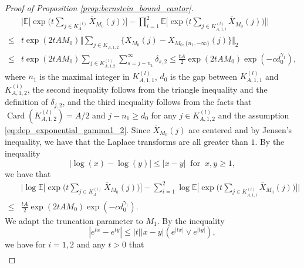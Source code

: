 \documentclass[11pt]{article}
\DeclareMathOperator*{\card}{Card}
\theoremstyle{plain}
\theoremstyle{definition}
\begin{document}
\begin{proof}[Proof of Proposition \ref{prop:bernstein_bound_cantor}]
    \begin{equation*}
    \begin{aligned}
        &\Big|\mathbb{E}\Big[\exp\Big(t\sum_{j \in K_{A}^{(l)}}\overline{X}_{M_0}(j)\Big)\Big] - \prod_{i=1}^2\mathbb{E}\Big[\exp\Big( t\sum_{j \in K_{A,1,i}^{(l)}}\overline{X}_{M_0}(j) \Big)\Big]\Big|\\
        \leq& t\exp(2tAM_0)\Big\Vert \sum_{j \in K_{A,1,2}}\{\overline{X}_{M_0}(j) - \overline{X}_{M_0, \{n_1, -\infty\}}(j)\} \Big\Vert_2\\
        \leq& t\exp(2tAM_0)\sum_{j \in K_{A,1,2}^{(l)}} \sum_{s = j-n_1}^{\infty}\delta_{s,2} \leq \frac{tA}{2}\exp(2tAM_0)\exp(-cd_0^{\gamma_1}),
    \end{aligned}
    \end{equation*}
    where $n_1$ is the maximal integer in $K_{A,1,1}^{(l)}$, $d_0$ is the gap between $K_{A,1,1}^{(l)}$ and $K_{A,1,2}^{(l)}$, the second inequality follows from the triangle inequality and the definition of $\delta_{j,2}$, and the third inequality follows from the facts that $\card(K_{A,1,2}^{(l)}) = A/2$ and $j - n_1 \geq d_0$ for any $j \in K_{A,1,2}^{(l)}$ and the assumption \eqref{eq:dep_exponential_gamma1_2}. Since $\overline{X}_{M_0}(j)$ are centered and by Jensen's inequality, we have that the Laplace transforms are all greater than $1$. By the inequality 
    \begin{equation}\label{eq:elementary_inequ_1}
        |\log(x) - \log(y)| \leq |x -y| \;\; \text{for} \;\; x,y \geq 1,
    \end{equation}
    we have that
    \begin{equation}\label{eq:decomp_step1}
    \begin{aligned}
        &\Big|\log\mathbb{E}\Big[\exp\Big(t\sum_{j \in K_{A}^{(l)}}\overline{X}_{M_0}(j)\Big)\Big] - \sum_{i=1}^2\log\mathbb{E}\Big[\exp\Big( t\sum_{j \in K_{A,1,i}^{(l)}}\overline{X}_{M_0}(j) \Big)\Big]\Big|\\
        \leq& \frac{tA}{2}\exp(2tAM_0)\exp(-cd_0^{\gamma_1}).
    \end{aligned}
    \end{equation}
    We adapt the truncation parameter to $M_1$. By the inequality 
    \begin{equation}\label{eq:elementary_inequ_2}
        |e^{tx} - e^{ty}| \leq |t||x-y|(e^{|tx|} \vee e^{|ty|}),
    \end{equation}
    we have for $i = 1, 2$ and any $t >0$ that
    \begin{equation*}
    \begin{aligned}

\end{aligned}
\end{equation*}
\end{proof}
\end{document}
